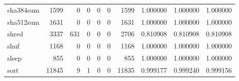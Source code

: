 \begin{tabular}{lrrrrrrrrr}
sha384sum &                                1599 &                                               0 &                                              0 &                                             0 &                                              0 &                                         1599 &                                           1.000000 &                               1.000000 &                             1.000000 \\
sha512sum &                                1631 &                                               0 &                                              0 &                                             0 &                                              0 &                                         1631 &                                           1.000000 &                               1.000000 &                             1.000000 \\
shred     &                                3337 &                                             631 &                                              0 &                                             0 &                                              0 &                                         2706 &                                           0.810908 &                               0.810908 &                             0.810908 \\
shuf      &                                1168 &                                               0 &                                              0 &                                             0 &                                              0 &                                         1168 &                                           1.000000 &                               1.000000 &                             1.000000 \\
sleep     &                                 855 &                                               0 &                                              0 &                                             0 &                                              0 &                                          855 &                                           1.000000 &                               1.000000 &                             1.000000 \\
sort      &                               11845 &                                               9 &                                              1 &                                             0 &                                              0 &                                        11835 &                                           0.999177 &                               0.999240 &                             0.999156 \\

\end{tabular}
